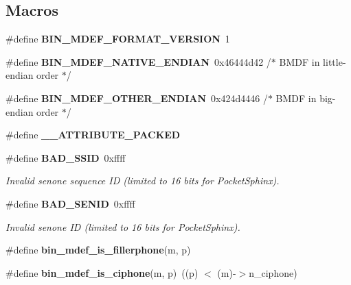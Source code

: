 \subsection*{Macros}
\begin{DoxyCompactItemize}
\item 
\#define {\bfseries B\+I\+N\+\_\+\+M\+D\+E\+F\+\_\+\+F\+O\+R\+M\+A\+T\+\_\+\+V\+E\+R\+S\+I\+O\+N}~1\label{bin__mdef_8h_a200a7e1836fa80ffe56b15334b1a8d1d}

\item 
\#define {\bfseries B\+I\+N\+\_\+\+M\+D\+E\+F\+\_\+\+N\+A\+T\+I\+V\+E\+\_\+\+E\+N\+D\+I\+A\+N}~0x46444d42 /$\ast$ \textquotesingle{}\+B\+M\+D\+F\textquotesingle{} in little-\/endian order $\ast$/\label{bin__mdef_8h_a9d58ffda11ea44f2681848072cb64ddd}

\item 
\#define {\bfseries B\+I\+N\+\_\+\+M\+D\+E\+F\+\_\+\+O\+T\+H\+E\+R\+\_\+\+E\+N\+D\+I\+A\+N}~0x424d4446  /$\ast$ \textquotesingle{}\+B\+M\+D\+F\textquotesingle{} in big-\/endian order $\ast$/\label{bin__mdef_8h_aafe4efcf837bc5c4b2392cd7e77c1ebd}

\item 
\#define {\bfseries \+\_\+\+\_\+\+A\+T\+T\+R\+I\+B\+U\+T\+E\+\_\+\+P\+A\+C\+K\+E\+D}\label{bin__mdef_8h_aefbcc16d264f773388235497c2e3518f}

\item 
\#define {\bf B\+A\+D\+\_\+\+S\+S\+I\+D}~0xffff\label{bin__mdef_8h_a8ee283c316e9f4aa8e6d18c1d44026bc}

\begin{DoxyCompactList}\small\item\em Invalid senone sequence I\+D (limited to 16 bits for Pocket\+Sphinx). \end{DoxyCompactList}\item 
\#define {\bf B\+A\+D\+\_\+\+S\+E\+N\+I\+D}~0xffff\label{bin__mdef_8h_ab6c771eca798ab8c94e0933a1f8daafc}

\begin{DoxyCompactList}\small\item\em Invalid senone I\+D (limited to 16 bits for Pocket\+Sphinx). \end{DoxyCompactList}\item 
\#define {\bfseries bin\+\_\+mdef\+\_\+is\+\_\+fillerphone}(m,  p)
\item 
\#define {\bfseries bin\+\_\+mdef\+\_\+is\+\_\+ciphone}(m,  p)~((p) $<$ (m)-\/$>$n\+\_\+ciphone)\label{bin__mdef_8h_ad1440dcf8f6df7daf54dca1c85b7aa9e}


\end{DoxyCompactItemize}
